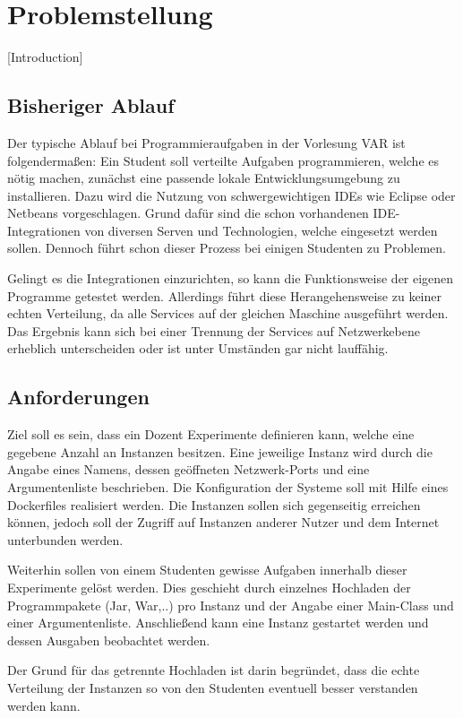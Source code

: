 \chapter{Problemstellung}
[Introduction] \blindtext
\section{Bisheriger Ablauf}
Der typische Ablauf bei Programmieraufgaben in der Vorlesung \ac{VAR} ist folgendermaßen:
Ein Student soll verteilte Aufgaben programmieren, welche es nötig machen, zunächst eine passende lokale Entwicklungsumgebung zu installieren.
Dazu wird die Nutzung von schwergewichtigen \acp{IDE} wie Eclipse oder Netbeans vorgeschlagen.
Grund dafür sind die schon vorhandenen \ac{IDE}-Integrationen von diversen Serven und Technologien, welche eingesetzt werden sollen.
Dennoch führt schon dieser Prozess bei einigen Studenten zu Problemen.
\par
Gelingt es die Integrationen einzurichten, so kann die Funktionsweise der eigenen Programme getestet werden.
Allerdings führt diese Herangehensweise zu keiner echten Verteilung, da alle Services auf der gleichen Maschine ausgeführt werden.
Das Ergebnis kann sich bei einer Trennung der Services auf Netzwerkebene erheblich unterscheiden oder ist unter Umständen gar nicht lauffähig.
\par
[TODO: Beispiel einer Aufgabe z.B. RMI-Chat]
\section{Anforderungen}
Ziel soll es sein, dass ein Dozent Experimente definieren kann, welche eine gegebene Anzahl an Instanzen besitzen.
Eine jeweilige Instanz wird durch die Angabe eines Namens, dessen geöffneten Netzwerk-Ports und eine Argumentenliste beschrieben.
Die Konfiguration der Systeme soll mit Hilfe eines Dockerfiles realisiert werden.
Die Instanzen sollen sich gegenseitig erreichen können, jedoch soll der Zugriff auf Instanzen anderer Nutzer und dem Internet unterbunden werden.
\par
Weiterhin sollen von einem Studenten gewisse Aufgaben innerhalb dieser Experimente gelöst werden.
Dies geschieht durch einzelnes Hochladen der Programmpakete (Jar, War,..) pro Instanz und der Angabe einer Main-Class und einer Argumentenliste.
Anschließend kann eine Instanz gestartet werden und dessen Ausgaben beobachtet werden.
\par
Der Grund für das getrennte Hochladen ist darin begründet, dass die echte Verteilung der Instanzen so von den Studenten eventuell besser verstanden werden kann.

